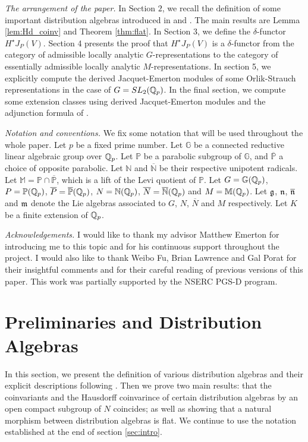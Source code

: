 \documentclass[10pt]{amsart}
\begin{document}
\textit{The arrangement of the paper.} In Section $2$, we recall the definition of some important distribution algebras introduced in \cite{ST_dist} and \cite{analytic}. The main results are Lemma \ref{lem:Hd_coinv} and Theorem \ref{thm:flat}. In Section 3, we define the $\delta$-functor $H^{\star}J_{P}(V)$. Section 4 presents the proof that $H^{\star}J_{P}(V)$ is a $\delta$-functor from the category of admissible locally analytic $G$-representations to the category of essentially admissible locally analytic $M$-representations. In section 5, we explicitly compute the derived Jacquet-Emerton modules of some Orlik-Strauch representations in the case of $G=SL_{2}(\mathbb{Q}_{p})$. In the final section, we compute some extension classes using derived Jacquet-Emerton modules and the adjunction formula of \cite[Lem. 0.3]{Jacquet2}. 

\textit{Notation and conventions.} We fix some notation that will be used throughout the whole paper. Let $p$ be a fixed prime number. Let $\mathbb{G}$ be a connected reductive linear algebraic group over $\mathbb{Q}_{p}$. Let $\mathbb{P}$ be a parabolic subgroup of $\mathbb{G}$, and $\overline{\mathbb{P}}$ a choice of opposite parabolic. Let $\mathbb{N}$ and $\overline{\mathbb{N}}$ be their respective unipotent radicals. Let $\mathbb{M}=\mathbb{P}\cap\overline{\mathbb{P}}$, which is a lift of the Levi quotient of $\mathbb{P}$. Let $G=\mathbb{G}(\mathbb{Q}_{p})$, $P=\mathbb{P}(\mathbb{Q}_{p})$, $\overline{P}=\overline{\mathbb{P}}(\mathbb{Q}_{p})$, $N=\mathbb{N}(\mathbb{Q}_{p})$, $\overline{N}=\overline{\mathbb{N}}(\mathbb{Q}_{p})$ and $M=\mathbb{M}(\mathbb{Q}_{p})$. Let $\mathfrak{g}$, $\mathfrak{n}$, $\overline{\mathfrak{n}}$ and $\mathfrak{m}$ denote the Lie algebras associated to $G$, $N$, $\overline{N}$ and $M$ respectively. Let $K$ be a finite extension of $\mathbb{Q}_{p}$.

\textit{Acknowledgements.}  I would like to thank my advisor Matthew Emerton for introducing me to this topic and for his continuous support throughout the project. I would also like to thank Weibo Fu, Brian Lawrence and Gal Porat for their insightful comments and for their careful reading of previous versions of this paper. This work was partially supported by the NSERC PGS-D program.  

\vspace{3mm}
\section{Preliminaries and Distribution Algebras}\label{sec:dist}

In this section, we present the definition of various distribution algebras and their explicit descriptions following \cite{analytic, ST_dist}. Then we prove two main results: that the coinvariants and the Hausdorff coinvarince of certain distribution algebras by an open compact subgroup of $N$ coincides; as well as showing that a natural morphism between distribution algebras is flat. We continue to use the notation established at the end of section \ref{sec:intro}.
\end{document}
